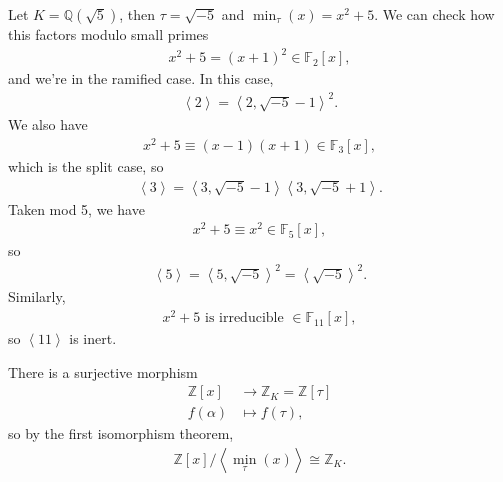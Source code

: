 \begin{example}[?]

Let \(K = {\mathbb{Q}}( \sqrt{5} )\), then \(\tau= \sqrt{-5}\) and
\(\min_\tau(x) = x^2 + 5\). We can check how this factors modulo small
primes
\begin{align*}
x^2 + 5 = (x+1)^2 \in {\mathbb{F}}_2[x]
,\end{align*}
and we're in the ramified case. In this case,
\begin{align*}
\left\langle{ 2 }\right\rangle = \left\langle{ 2, \sqrt{ -5} -1 }\right\rangle^2  
.\end{align*}
We also have
\begin{align*}
x^2 + 5 \equiv (x-1)(x+1) \in {\mathbb{F}}_3[x]
,\end{align*}
which is the split case, so
\begin{align*}
\left\langle{ 3 }\right\rangle= \left\langle{ 3, \sqrt{-5} -1 }\right\rangle \left\langle{ 3, \sqrt{-5} + 1 }\right\rangle   
.\end{align*}
Taken mod 5, we have
\begin{align*}
x^2 + 5 \equiv x^2 \in {\mathbb{F}}_5[x]
,\end{align*}
so
\begin{align*}
\left\langle{ 5 }\right\rangle = \left\langle{ 5, \sqrt{-5} }\right\rangle^2 = \left\langle{ \sqrt{-5} }\right\rangle ^2 
.\end{align*}
Similarly,
\begin{align*}
x^2 + 5 \text{ is irreducible } \in {\mathbb{F}}_{11}[x]
,\end{align*}
so \(\left\langle{ 11 }\right\rangle\) is inert.

\end{example}

\begin{lemma}[?]

There is a surjective morphism
\begin{align*}
{\mathbb{Z}}[x] &\to {\mathbb{Z}}_K = {\mathbb{Z}}[ \tau ] \\
f( \alpha) &\mapsto f( \tau)
,\end{align*}
so by the first isomorphism theorem,
\begin{align*}
{\mathbb{Z}}[x] / \left\langle{ \min_\tau(x) }\right\rangle \cong {\mathbb{Z}}_K 
.\end{align*}

\end{lemma}

